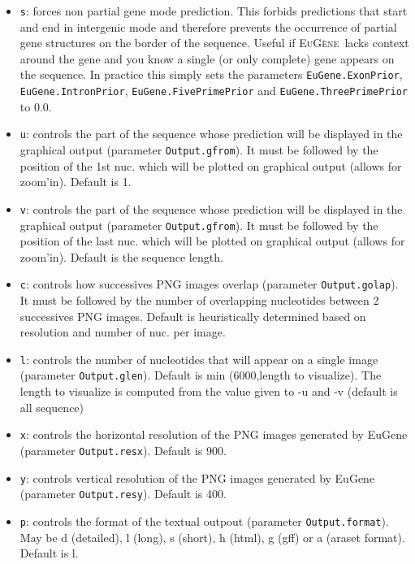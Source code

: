 \documentclass[a4paper,titlepage]{report}
\newcommand{\EuGenie}{\textsc{EuG\`ene}}
\begin{document}
\begin{itemize}
  
\item \texttt{s}: forces non partial gene mode prediction. This forbids
  predictions that start and end in intergenic mode and therefore
  prevents the occurrence of partial gene structures on the border of
  the sequence.  Useful if \EuGenie\ lacks context around the gene and
  you know a single (or only complete) gene appears on the sequence.
  In practice this simply sets the parameters
  \texttt{EuGene.ExonPrior}, \texttt{EuGene.IntronPrior},
  \texttt{EuGene.FivePrimePrior} and \texttt{EuGene.ThreePrimePrior}
  to $0.0$.
 
\item \texttt{u}: controls the part of the sequence whose prediction will be
  displayed in the graphical output (parameter \texttt{Output.gfrom}). It must
  be followed by the position of the 1st nuc. which will be plotted on
  graphical output (allows for zoom'in).  Default is 1.
  
\item \texttt{v}: controls the part of the sequence whose prediction will be
  displayed in the graphical output (parameter \texttt{Output.gfrom}).
  It must be followed by the position of the last nuc. which will be
  plotted on graphical output (allows for zoom'in). Default is the
  sequence length.
  
\item \texttt{c}: controls how successives PNG images overlap (parameter
  \texttt{Output.golap}). It must be followed by the number of
  overlapping nucleotides between 2 successives PNG images. Default is
  heuristically determined based on resolution and number of nuc. per
  image.
  
\item \texttt{l}: controls the number of nucleotides that will appear on a
  single image (parameter \texttt{Output.glen}). Default is min
  (6000,length to visualize). The length to visualize is computed from
  the value given to -u and -v (default is all sequence)
  
\item \texttt{x}: controls the horizontal resolution of the PNG images
  generated by EuGene (parameter \texttt{Output.resx}). Default is
  900.
  
\item \texttt{y}: controls vertical resolution of the PNG images generated by
  EuGene (parameter \texttt{Output.resy}).  Default is 400.
          
\item \texttt{p}: controls the format of the textual outpout (parameter
  \texttt{Output.format}). May be d (detailed), l (long), s (short), h
  (html), g (gff) or a (araset format). Default is l.
  

\end{itemize}
\end{document}
